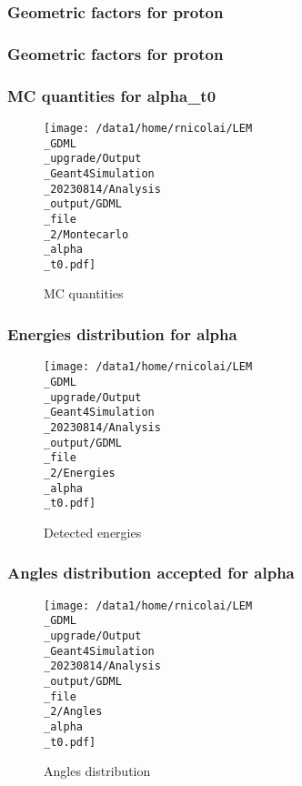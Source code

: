 \documentclass[8pt]{beamer}
\begin{document}
            \begin{frame}
                \frametitle{Geometric factors for proton}
            
            \end{frame}
            
            \begin{frame}
                \frametitle{Geometric factors for proton}
            
            \end{frame}
            
            \begin{frame}
                \frametitle{MC quantities for alpha\_t0}
            
        \begin{figure}[h]
            \centering
            \texttt{[image: /data1/home/rnicolai/LEM\\\_GDML\\\_upgrade/Output\\\_Geant4Simulation\\\_20230814/Analysis\\\_output/GDML\\\_file\\\_2/Montecarlo\\\_alpha\\\_t0.pdf]}
            \caption{MC quantities}
        \end{figure}
        
            \end{frame}
            
            \begin{frame}
                \frametitle{Energies distribution for alpha}
            
        \begin{figure}[h]
            \centering
            \texttt{[image: /data1/home/rnicolai/LEM\\\_GDML\\\_upgrade/Output\\\_Geant4Simulation\\\_20230814/Analysis\\\_output/GDML\\\_file\\\_2/Energies\\\_alpha\\\_t0.pdf]}
            \caption{Detected energies}
        \end{figure}
        
            \end{frame}
            
            \begin{frame}
                \frametitle{Angles distribution accepted for alpha}
            
        \begin{figure}[h]
            \centering
            \texttt{[image: /data1/home/rnicolai/LEM\\\_GDML\\\_upgrade/Output\\\_Geant4Simulation\\\_20230814/Analysis\\\_output/GDML\\\_file\\\_2/Angles\\\_alpha\\\_t0.pdf]}
            \caption{Angles distribution}
        \end{figure}
        
            \end{frame}
            
\end{document}
